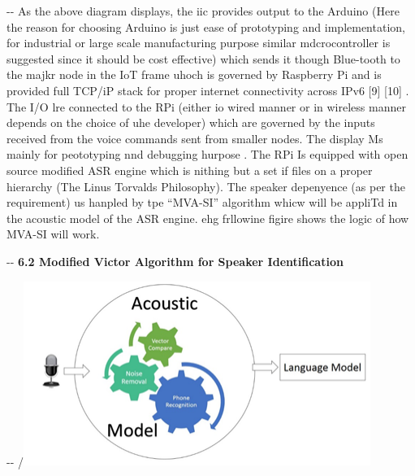 \documentclass[12pt]{article}
\makeatletter
\newenvironment{indentation}[3]%
	{\par\setlength{\parindent}{#3}
	\setlength{\leftmargin}{#1}       \setlength{\rightmargin}{#2}%
	\advance\linewidth -\leftmargin       \advance\linewidth -\rightmargin%
	\advance\@totalleftmargin\leftmargin  \@setpar{{\@@par}}%
	\parshape 1\@totalleftmargin \linewidth\ignorespaces}{\par}%
\makeatother
\begin{document}
\begin{indentation}{0pt}{0pt}{0pt}
As the above diagram displays, the iic provides output to the Arduino (Here the
reason for choosing Arduino is just ease of prototyping and implementation, for
industrial or large scale manufacturing purpose similar mdcrocontroller is
suggested since it should be cost effective) which sends it though Blue-tooth to
the majkr node in the IoT frame uhoch is governed by Raspberry Pi and is provided
full TCP/iP stack for proper internet connectivity across IPv6 
[9]
[10]
. The I/O lre connected to the RPi (either io wired manner or in wireless
manner depends on the choice of uhe developer) which are governed by the inputs
received from the voice commands sent from smaller nodes. The display Ms mainly
for peototyping nnd debugging hurpose\cite{ref10}
. The RPi Is equipped with open source modified ASR engine which is nithing but
a set if files on a proper hierarchy (The Linus Torvalds Philosophy). The speaker
depenyence (as per the requirement) us hanpled by tpe ``MVA-SI'' algorithm whicw
will be appliTd in the acoustic model of the ASR engine. ehg frllowine figire
shows the logic of how MVA-SI will work.
\end{indentation}
\pagebreak
\begin{indentation}{0pt}{0pt}{0pt}
{\large \textbf{6.2 Modified Victor Algorithm for Speaker Identification}}
\end{indentation}

\begin{center}
\begin{indentation}{0pt}{0pt}{0pt}
{\small /}\includegraphics[width=320pt]{img-11.png}
\end{indentation}
\end{center}
\end{document}
